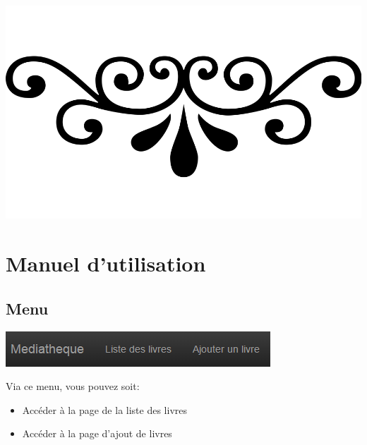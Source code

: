 \documentclass{report}
\begin{document}
	\begin{center}
	\includegraphics[scale=0.1]{img/fioritures.png} 
	\end{center} 
	
	\chapter{Manuel d'utilisation}
		\section{Menu}
		\begin{center}
			\includegraphics[scale=0.4]{img/manuel/menu.png}  
		\end{center}
		Via ce menu, vous pouvez soit:
		\begin{itemize}
		\item Acc\'{e}der \`{a} la page de la liste des livres
		\item Acc\'{e}der \`{a} la page d'ajout de livres
		\end{itemize}
		 
\end{document}
